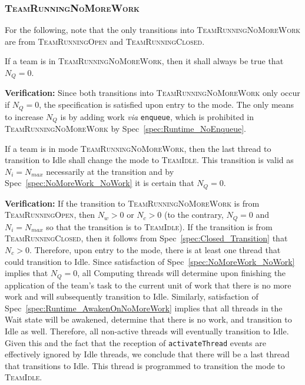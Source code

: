 \documentclass{article}
\newcommand{\TeamIdle}          {\textsc{TeamIdle}}
\newcommand{\TeamRunningOpen}   {\textsc{TeamRunningOpen}}
\newcommand{\TeamRunningClosed} {\textsc{TeamRunningClosed}}
\newcommand{\TeamRunningNoMoreWork} {\textsc{TeamRunningNoMoreWork}}
\begin{document}
\subsubsection{\TeamRunningNoMoreWork}
For the following, note that the only transitions into {\TeamRunningNoMoreWork}
are from {\TeamRunningOpen} and \TeamRunningClosed.

\begin{spec}
\label{spec:NoMoreWork_NoWork}
If a team is in \TeamRunningNoMoreWork, then it shall always be true that $N_Q =
0$.
\end{spec}
\textbf{Verification:}\hspace{0.125in}  
Since both transitions into {\TeamRunningNoMoreWork} only occur if $N_Q = 0$,
the specification is satisfied upon entry to the mode.  The only means to
increase $N_Q$ is by adding work \textit{via} \texttt{enqueue}, which is
prohibited in {\TeamRunningNoMoreWork} by Spec~\ref{spec:Runtime_NoEnqueue}.

\begin{spec}
\label{spec:NoMoreWork_TransitionToIdle}
If a team is in mode \TeamRunningNoMoreWork, then the last thread to transition
to Idle shall change the mode to \TeamIdle.  This transition is valid as $N_i =
N_{max}$ necessarily at the transition and by Spec~\ref{spec:NoMoreWork_NoWork}
it is certain that $N_Q = 0$.
\end{spec}
\textbf{Verification:}\hspace{0.125in}  If the transition to
{\TeamRunningNoMoreWork} is from \TeamRunningOpen, then $N_w > 0$ or $N_c > 0$
(to the contrary, $N_Q = 0$ and $N_i = N_{max}$ so that the transition is to
\TeamIdle).  If the transition is from \TeamRunningClosed, then it follows from
Spec~\ref{spec:Closed_Transition} that $N_c > 0$.  Therefore, upon entry to the
mode, there is at least one thread that could transition to Idle.  Since
satisfaction of Spec~\ref{spec:NoMoreWork_NoWork} implies that $N_Q = 0$, all
Computing threads will determine upon finishing the application of the team's
task to the current unit of work that there is no more work and will
subsequently transition to Idle.  Similarly, satisfaction of
Spec~\ref{spec:Runtime_AwakenOnNoMoreWork} implies that all threads in the Wait
state will be awakened, determine that there is no work, and transition to Idle
as well.  Therefore, all non-active threads will eventually transition to Idle.
Given this and the fact that the reception of \texttt{activateThread} events are
effectively ignored by Idle threads, we conclude that there will be a last
thread that transitions to Idle.  This thread is programmed to transition the
mode to \TeamIdle.
\end{document}
